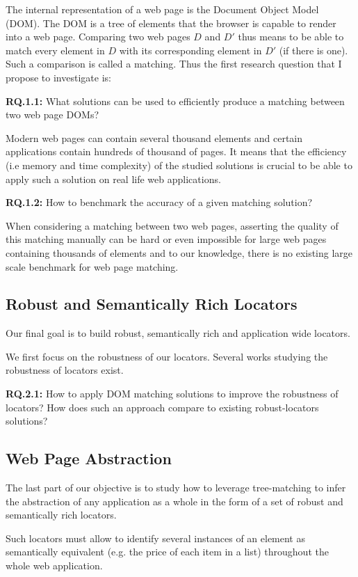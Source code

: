 The internal representation of a web page is the Document Object Model (DOM). The DOM is a tree of elements that the browser is capable to render into a web page.
Comparing two web pages $D$ and $D'$ thus means to be able to match every element in $D$ with its corresponding element in $D'$ (if there is one). Such a comparison is called a matching.
Thus the first research question that I propose to investigate is:

\textbf{RQ.1.1:} What solutions can be used to efficiently produce a matching between two web page DOMs?

Modern web pages can contain several thousand elements and certain applications contain hundreds of thousand of pages. It means that the efficiency (i.e memory and time complexity) of the studied solutions is crucial to be able to apply such a solution on real life web applications.

\textbf{RQ.1.2:} How to benchmark the accuracy of a given matching solution?

When considering a matching between two web pages, asserting the quality of this matching manually can be hard or even impossible for large web pages containing thousands of elements and to our knowledge, there is no existing large scale benchmark for web page matching.

\subsection{Robust and Semantically Rich Locators}
Our final goal is to build robust, semantically rich and application wide locators.

We first focus on the robustness of our locators. 
Several works studying the robustness of locators exist.

\textbf{RQ.2.1:} How to apply DOM matching solutions to improve the robustness of locators? How does such an approach compare to existing robust-locators solutions?

\subsection{Web Page Abstraction}
The last part of our objective is to study how to leverage tree-matching to infer the abstraction of any application as a whole in the form of a set of robust and semantically rich locators.

Such locators must allow to identify several instances of an element as semantically equivalent (e.g. the price of each item in a list) throughout the whole web application.

